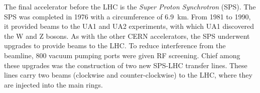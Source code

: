 The final accelerator before the LHC is the \emph{Super Proton Synchrotron} (SPS).
The SPS was completed in 1976 with a circumference of 6.9~km.
From 1981 to 1990, it provided beams to the UA1 and UA2 experiments, with which UA1 discovered the W and Z bosons.
As with the other CERN accelerators, the SPS underwent upgrades to provide beams to the LHC.
To reduce interference from the beamline, 800 vacuum pumping ports were given RF screening. \cite{schindl}
Chief among these upgrades was the construction of two new SPS-LHC transfer lines.
These lines carry two beams (clockwise and counter-clockwise) to the LHC, where they are injected into the main rings.

